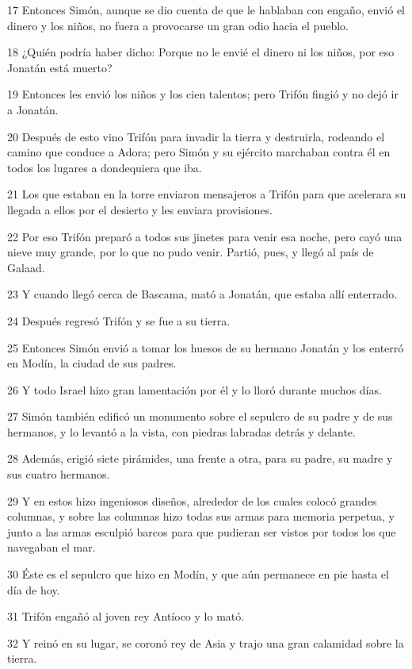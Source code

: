 \par 17 Entonces Simón, aunque se dio cuenta de que le hablaban con engaño, envió el dinero y los niños, no fuera a provocarse un gran odio hacia el pueblo.
\par 18 ¿Quién podría haber dicho: Porque no le envié el dinero ni los niños, por eso Jonatán está muerto?
\par 19 Entonces les envió los niños y los cien talentos; pero Trifón fingió y no dejó ir a Jonatán.
\par 20 Después de esto vino Trifón para invadir la tierra y destruirla, rodeando el camino que conduce a Adora; pero Simón y su ejército marchaban contra él en todos los lugares a dondequiera que iba.
\par 21 Los que estaban en la torre enviaron mensajeros a Trifón para que acelerara su llegada a ellos por el desierto y les enviara provisiones.
\par 22 Por eso Trifón preparó a todos sus jinetes para venir esa noche, pero cayó una nieve muy grande, por lo que no pudo venir. Partió, pues, y llegó al país de Galaad.
\par 23 Y cuando llegó cerca de Bascama, mató a Jonatán, que estaba allí enterrado.
\par 24 Después regresó Trifón y se fue a su tierra.
\par 25 Entonces Simón envió a tomar los huesos de su hermano Jonatán y los enterró en Modín, la ciudad de sus padres.
\par 26 Y todo Israel hizo gran lamentación por él y lo lloró durante muchos días.
\par 27 Simón también edificó un monumento sobre el sepulcro de su padre y de sus hermanos, y lo levantó a la vista, con piedras labradas detrás y delante.
\par 28 Además, erigió siete pirámides, una frente a otra, para su padre, su madre y sus cuatro hermanos.
\par 29 Y en estos hizo ingeniosos diseños, alrededor de los cuales colocó grandes columnas, y sobre las columnas hizo todas sus armas para memoria perpetua, y junto a las armas esculpió barcos para que pudieran ser vistos por todos los que navegaban el mar.
\par 30 Éste es el sepulcro que hizo en Modín, y que aún permanece en pie hasta el día de hoy.
\par 31 Trifón engañó al joven rey Antíoco y lo mató.
\par 32 Y reinó en su lugar, se coronó rey de Asia y trajo una gran calamidad sobre la tierra.
